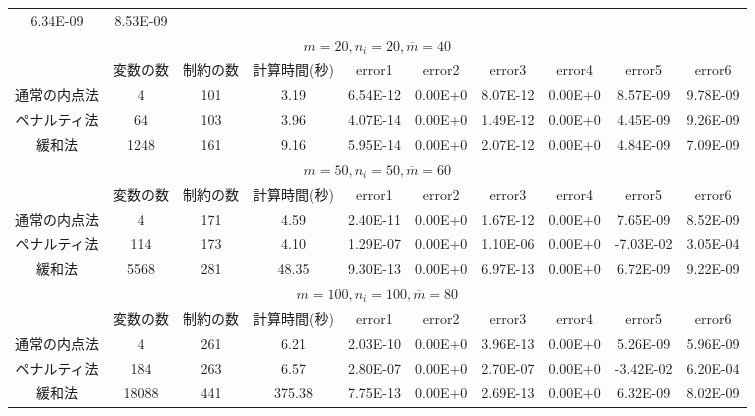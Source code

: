 \documentclass[11pt,a4paper,dvipdfmx,titlepage,uplatex]{jsarticle}
\theoremstyle{mystyle}
\newcommand{\0}{\mathbf{0}}
\begin{document}
\begin{table}[h]
\begin{tabular}{|c|c|c|c|c|c|c|c|c|c|}
    6.34E-09 & 8.53E-09 \\
    \cline{1-10}
    \multicolumn{10}{|c|}{$m = 20,n_i = 20,\overline{m} = 40$}\\
    \cline{1-10}
    & 変数の数 & 制約の数 & 計算時間(秒) & error1 & error2 & error3 & error4 & error5 & error6 \\
    \cline{1-10}
    通常の内点法  & 4 & 101 & 3.19 & 6.54E-12 & 0.00E+0 & 8.07E-12 & 0.00E+0 & 8.57E-09 & 9.78E-09 \\
    \cline{1-10}
    ペナルティ法 & 64 & 103 & 3.96 & 4.07E-14 & 0.00E+0 & 1.49E-12 & 0.00E+0 & 4.45E-09 & 9.26E-09 \\
    \cline{1-10}
    緩和法 & 1248 & 161 & 9.16 & 5.95E-14 & 0.00E+0 & 2.07E-12 & 0.00E+0 & 4.84E-09 & 7.09E-09 \\
    \cline{1-10}
    \multicolumn{10}{|c|}{$m = 50,n_i = 50,\overline{m} = 60$}\\
    \cline{1-10}
    & 変数の数 & 制約の数 & 計算時間(秒) & error1 & error2 & error3 & error4 & error5 & error6 \\
    \cline{1-10}
    通常の内点法  & 4 & 171 & 4.59 & 2.40E-11 & 0.00E+0 & 1.67E-12 & 0.00E+0 & 7.65E-09 & 8.52E-09 \\
    \cline{1-10}
    ペナルティ法 & 114 & 173 & 4.10 & 1.29E-07 & 0.00E+0 & 1.10E-06 & 0.00E+0 & -7.03E-02 & 3.05E-04 \\
    \cline{1-10}
    緩和法 & 5568 & 281 & 48.35 & 9.30E-13 & 0.00E+0 & 6.97E-13 & 0.00E+0 & 6.72E-09 & 9.22E-09 \\
    \cline{1-10}
    \multicolumn{10}{|c|}{$m = 100,n_i = 100,\overline{m} = 80$}\\
    \cline{1-10}
    & 変数の数 & 制約の数 & 計算時間(秒) & error1 & error2 & error3 & error4 & error5 & error6 \\
    \cline{1-10}
    通常の内点法  & 4 & 261 & 6.21 & 2.03E-10 & 0.00E+0 & 3.96E-13 & 0.00E+0 & 5.26E-09 & 5.96E-09 \\
    \cline{1-10}
    ペナルティ法 & 184 & 263 & 6.57 & 2.80E-07 & 0.00E+0 & 2.70E-07 & 0.00E+0 & -3.42E-02 & 6.20E-04 \\
    \cline{1-10}
    緩和法 & 18088 & 441 & 375.38 & 7.75E-13 & 0.00E+0 & 2.69E-13 & 0.00E+0 & 6.32E-09 & 8.02E-09 \\
    \cline{1-10}
  \end{tabular}
\end{table}
\end{document}
